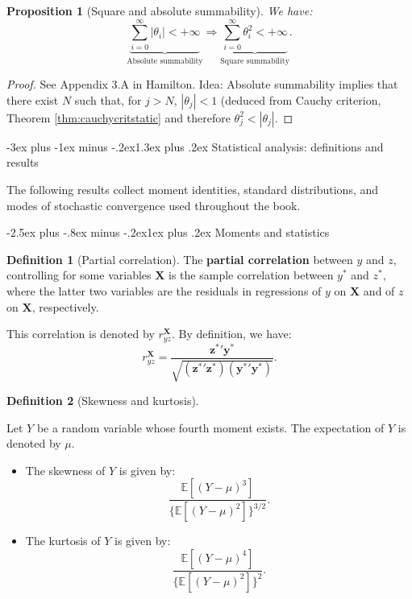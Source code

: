 \documentclass[
  11pt,
]{book}
\makeatletter
\providecommand{\tightlist}{%
  \setlength{\itemsep}{0pt}\setlength{\parskip}{0pt}}
\renewcommand\section{\@startsection{section}{1}{\z@}
  {-3ex plus -1ex minus -.2ex}{1.3ex plus .2ex}
  {\normalfont\Large\bfseries\color{TextbookInk}}}
\renewcommand\subsection{\@startsection{subsection}{2}{\z@}
  {-2.5ex plus -.8ex minus -.2ex}{1ex plus .2ex}
  {\normalfont\large\bfseries\color{TextbookInk}}}
\newtheorem{proposition}{Proposition}[chapter]
\theoremstyle{definition}
\newtheorem{definition}{Definition}[chapter]
\theoremstyle{definition}
\theoremstyle{definition}
\theoremstyle{definition}
\theoremstyle{remark}
\makeatother
\begin{document}
\begin{proposition}[Square and absolute summability]
\protect\hypertarget{prp:absMs}{}\label{prp:absMs}We have:
\[
\underbrace{\sum_{i=0}^{\infty}|\theta_i| < + \infty}_{\mbox{Absolute summability}} \Rightarrow \underbrace{\sum_{i=0}^{\infty} \theta_i^2 < + \infty}_{\mbox{Square summability}}.
\]
\end{proposition}

\begin{proof}
See Appendix 3.A in Hamilton. Idea: Absolute summability implies that there exist \(N\) such that, for \(j>N\), \(|\theta_j| < 1\) (deduced from Cauchy criterion, Theorem \ref{thm:cauchycritstatic} and therefore \(\theta_j^2 < |\theta_j|\).
\end{proof}

\section{Statistical analysis: definitions and results}\label{variousResults}

The following results collect moment identities, standard distributions, and modes of stochastic convergence used throughout the book.

\subsection{Moments and statistics}\label{moments-and-statistics}

\begin{definition}[Partial correlation]
\protect\hypertarget{def:partialcorrel}{}\label{def:partialcorrel}The \textbf{partial correlation} between \(y\) and \(z\), controlling for some variables \(\mathbf{X}\) is the sample correlation between \(y^*\) and \(z^*\), where the latter two variables are the residuals in regressions of \(y\) on \(\mathbf{X}\) and of \(z\) on \(\mathbf{X}\), respectively.

This correlation is denoted by \(r_{yz}^\mathbf{X}\). By definition, we have:
\begin{equation}
r_{yz}^\mathbf{X} = \frac{\mathbf{z^*}'\mathbf{y^*}}{\sqrt{(\mathbf{z^*}'\mathbf{z^*})(\mathbf{y^*}'\mathbf{y^*})}}.\label{eq:pc}
\end{equation}
\end{definition}

\begin{definition}[Skewness and kurtosis]
\protect\hypertarget{def:skewnesskurtosis}{}\label{def:skewnesskurtosis}

Let \(Y\) be a random variable whose fourth moment exists. The expectation of \(Y\) is denoted by \(\mu\).

\begin{itemize}
\tightlist
\item
  The skewness of \(Y\) is given by:
  \[
  \frac{\mathbb{E}[(Y-\mu)^3]}{\{\mathbb{E}[(Y-\mu)^2]\}^{3/2}}.
  \]
\item
  The kurtosis of \(Y\) is given by:
  \[
  \frac{\mathbb{E}[(Y-\mu)^4]}{\{\mathbb{E}[(Y-\mu)^2]\}^{2}}.
  \]
\end{itemize}

\end{definition}
\end{document}
